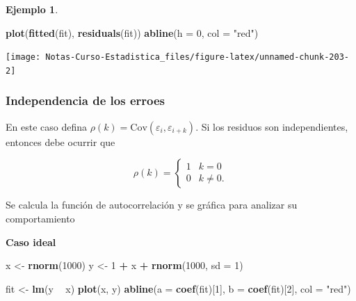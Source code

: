 \documentclass[
  12pt,
]{book}
\newenvironment{Shaded}{\begin{snugshade}}{\end{snugshade}}
\newcommand{\DataTypeTok}[1]{\textcolor[rgb]{0.13,0.29,0.53}{#1}}
\newcommand{\DecValTok}[1]{\textcolor[rgb]{0.00,0.00,0.81}{#1}}
\newcommand{\KeywordTok}[1]{\textcolor[rgb]{0.13,0.29,0.53}{\textbf{#1}}}
\newcommand{\NormalTok}[1]{#1}
\newcommand{\OperatorTok}[1]{\textcolor[rgb]{0.81,0.36,0.00}{\textbf{#1}}}
\newcommand{\StringTok}[1]{\textcolor[rgb]{0.31,0.60,0.02}{#1}}
\theoremstyle{definition}
\theoremstyle{definition}
\newtheorem{example}{Ejemplo}[chapter]
\theoremstyle{definition}
\theoremstyle{remark}
\begin{document}
\begin{example}
\begin{Shaded}
\begin{Highlighting}[]
\KeywordTok{plot}\NormalTok{(}\KeywordTok{fitted}\NormalTok{(fit), }\KeywordTok{residuals}\NormalTok{(fit))}
\KeywordTok{abline}\NormalTok{(}\DataTypeTok{h =} \DecValTok{0}\NormalTok{, }\DataTypeTok{col =} \StringTok{"red"}\NormalTok{)}
\end{Highlighting}
\end{Shaded}

\begin{center}\texttt{[image: Notas-Curso-Estadistica\_files/figure-latex/unnamed-chunk-203-2]} \end{center}

\end{example}

\hypertarget{independencia-de-los-erroes}{%
\subsubsection{Independencia de los erroes}\label{independencia-de-los-erroes}}

En este caso defina \(\rho(k) = \text{Cov}(\varepsilon_i,\varepsilon_{i+k} )\). Si los residuos son independientes, entonces debe ocurrir que

\begin{equation*}
\rho(k) = \begin{cases}
1 & k=0\\
0 & k\neq 0.
\end{cases}  
\end{equation*}

Se calcula la función de autocorrelación y se gráfica para analizar su comportamiento

\textbf{Caso ideal}

\begin{Shaded}
\begin{Highlighting}[]
\NormalTok{x <-}\StringTok{ }\KeywordTok{rnorm}\NormalTok{(}\DecValTok{1000}\NormalTok{)}
\NormalTok{y <-}\StringTok{ }\DecValTok{1} \OperatorTok{+}\StringTok{ }\NormalTok{x }\OperatorTok{+}\StringTok{ }\KeywordTok{rnorm}\NormalTok{(}\DecValTok{1000}\NormalTok{, }\DataTypeTok{sd =} \DecValTok{1}\NormalTok{)}
\end{Highlighting}
\end{Shaded}

\begin{Shaded}
\begin{Highlighting}[]
\NormalTok{fit <-}\StringTok{ }\KeywordTok{lm}\NormalTok{(y }\OperatorTok{~}\StringTok{ }\NormalTok{x)}
\KeywordTok{plot}\NormalTok{(x, y)}
\KeywordTok{abline}\NormalTok{(}\DataTypeTok{a =} \KeywordTok{coef}\NormalTok{(fit)[}\DecValTok{1}\NormalTok{], }\DataTypeTok{b =} \KeywordTok{coef}\NormalTok{(fit)[}\DecValTok{2}\NormalTok{], }\DataTypeTok{col =} \StringTok{"red"}\NormalTok{)}
\end{Highlighting}
\end{Shaded}
\end{document}

